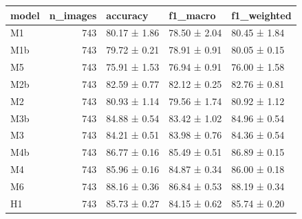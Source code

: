 \begin{tabular}{lrlll}
\toprule
model & n\_images & accuracy & f1\_macro & f1\_weighted \\
\midrule
M1 & 743 & 80.17 ± 1.86 & 78.50 ± 2.04 & 80.45 ± 1.84 \\
M1b & 743 & 79.72 ± 0.21 & 78.91 ± 0.91 & 80.05 ± 0.15 \\
M5 & 743 & 75.91 ± 1.53 & 76.94 ± 0.91 & 76.00 ± 1.58 \\
M2b & 743 & 82.59 ± 0.77 & 82.12 ± 0.25 & 82.76 ± 0.81 \\
M2 & 743 & 80.93 ± 1.14 & 79.56 ± 1.74 & 80.92 ± 1.12 \\
M3b & 743 & 84.88 ± 0.54 & 83.42 ± 1.02 & 84.96 ± 0.54 \\
M3 & 743 & 84.21 ± 0.51 & 83.98 ± 0.76 & 84.36 ± 0.54 \\
M4b & 743 & 86.77 ± 0.16 & 85.49 ± 0.51 & 86.89 ± 0.15 \\
M4 & 743 & 85.96 ± 0.16 & 84.87 ± 0.34 & 86.00 ± 0.18 \\
M6 & 743 & 88.16 ± 0.36 & 86.84 ± 0.53 & 88.19 ± 0.34 \\
H1 & 743 & 85.73 ± 0.27 & 84.15 ± 0.62 & 85.74 ± 0.20 \\
\bottomrule
\end{tabular}
